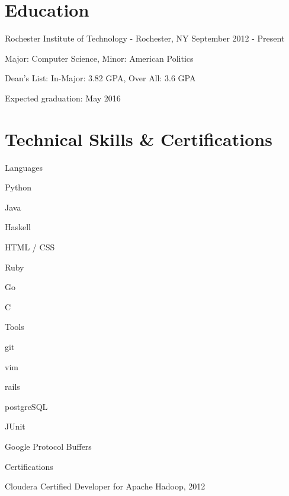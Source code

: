 \documentclass[a4paper,margin,line]{resume}
\newcommand{\rdate}[1]{\hfill {\small #1}}
\begin{document}
\begin{resume}
\section{\mysidestyle Education}
	\begin{compactdesc}
		\item[Rochester Institute of Technology] - Rochester, NY \rdate{September 2012 - Present}
		\begin{compactitem} { \small
			\item Major: Computer Science, Minor: American Politics
            \item Dean's List: In-Major: 3.82 GPA, Over All: 3.6 GPA
			\item Expected graduation: May 2016
		} \end{compactitem}
	\end{compactdesc}

\section{\mysidestyle Technical Skills \& Certifications}
	\begin{compactdesc}
		\item[Languages] \begin{inparaenum} { \small
			\item Python
			\item Java
            \item Haskell
			\item HTML / CSS
			\item Ruby
			\item Go
            \item C
		} \end{inparaenum}
		\item[Tools] \begin{inparaenum} { \small
			\item git
            \item vim
            \item rails
            \item postgreSQL
            \item JUnit
            \item Google Protocol Buffers
		} \end{inparaenum}
        \item[Certifications] \begin{inparaenum} { \small
            \item Cloudera Certified Developer for Apache Hadoop, 2012    
        } \end{inparaenum}
	\end{compactdesc}


\end{resume}
\end{document}
